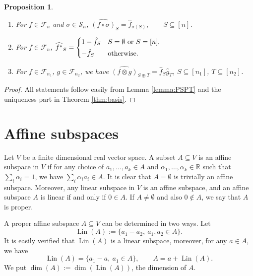 \documentclass[12pt]{article}
\newtheorem{prop}{Proposition}
\theoremstyle{definition}
\theoremstyle{remark}
\def\lin{\operatorname{Lin}}
\def\Fe{\mathcal F}
\def\permut{\mathscr{S}}
\begin{document}
\begin{prop}\label{prop:mobius} 

\begin{enumerate}
\item[(i)] For $f\in \Fe_n$ and  $\sigma\in \permut_n$, 
$\widehat{(f\circ \sigma)}_S=\hat f_{\sigma(S)}, \qquad S\subseteq [n]$.
\item[(ii)] For $f\in \Fe_n$, $\widehat{f^*}_S=\begin{dcases} 1-\hat f_S & S=\emptyset\text{ or } S=[n],\\
-\hat f_S & \text{otherwise}.
\end{dcases}$
\item[(iii)] For $f\in \Fe_{n_1}$, $g\in \Fe_{n_2}$, we have 
$\widehat{(f\otimes g)}_{S\oplus T}=\hat f_S\hat g_T$, $S\subseteq [n_1]$, $T\subseteq
[n_2]$.
%
\end{enumerate}


\end{prop}

\begin{proof} All statements follow easily from Lemma \ref{lemma:PSPT} and the uniqueness part in Theorem
\ref{thm:basis}. 


\end{proof}

\section{Affine subspaces}
\label{sec:app_affine}
Let $V$ be a finite dimensional real vector space. A subset $A\subseteq V$ is an affine
subspace in $V$ if for any choice of  $a_1,\dots, a_k\in A$ and  $\alpha_1,\dots,\alpha_k\in \mathbb R$
such that $\sum_i\alpha_i=1$, we have $\sum_i\alpha_i a_i\in A$. It is clear that
$A=\emptyset$ is trivially an affine subspace.  Moreover, any linear subspace in $V$ is an affine subspace,
and an
affine subspace $A$ is linear if and only if $0\in A$. If $A \neq\emptyset$ and also
$0\notin A$, we say that $A$ is proper. 

A proper  affine subspace $A\subseteq V$ can be determined in two ways. Let 
\[
\lin(A):=\{a_1-a_2,\ a_1,a_2\in A\}.
\]
It is easily verified that $\lin(A)$ is a linear subspace, moreover, for any $a\in A$, we
have
\begin{equation}\label{eq:affine_l}
\lin(A)=\{a_1-a,\ a_1\in A\},\qquad A=a+\lin(A).
\end{equation}
We put $\dim(A):=\dim(\lin(A))$, the dimension of $A$. 
\end{document}
